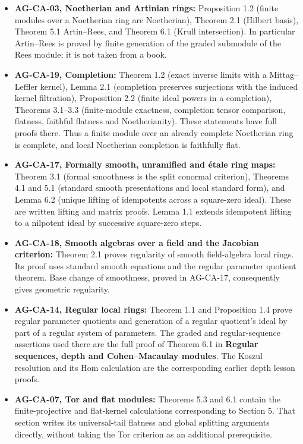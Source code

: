 \documentclass[11pt,a4paper,openany]{report}
\providecommand{\tightlist}{\setlength{\itemsep}{0pt}\setlength{\parskip}{0pt}}
\begin{document}
\begin{itemize}
\tightlist
\item
  \textbf{AG-CA-03, Noetherian and Artinian rings:} Proposition 1.2 (finite modules over a Noetherian ring are Noetherian), Theorem 2.1 (Hilbert basis), Theorem 5.1 Artin--Rees, and Theorem 6.1 (Krull intersection). In particular Artin--Rees is proved by finite generation of the graded submodule of the Rees module; it is not taken from a book.
\item
  \textbf{AG-CA-19, Completion:} Theorem 1.2 (exact inverse limits with a Mittag--Leffler kernel), Lemma 2.1 (completion preserves surjections with the induced kernel filtration), Proposition 2.2 (finite ideal powers in a completion), Theorems 3.1--3.3 (finite-module exactness, completion tensor comparison, flatness, faithful flatness and Noetherianity). These statements have full proofs there. Thus a finite module over an already complete Noetherian ring is complete, and local Noetherian completion is faithfully flat.
\item
  \textbf{AG-CA-17, Formally smooth, unramified and étale ring maps:} Theorem 3.1 (formal smoothness is the split conormal criterion), Theorems 4.1 and 5.1 (standard smooth presentations and local standard form), and Lemma 6.2 (unique lifting of idempotents across a square-zero ideal). These are written lifting and matrix proofs. Lemma 1.1 extends idempotent lifting to a nilpotent ideal by successive square-zero steps.
\item
  \textbf{AG-CA-18, Smooth algebras over a field and the Jacobian criterion:} Theorem 2.1 proves regularity of smooth field-algebra local rings. Its proof uses standard smooth equations and the regular parameter quotient theorem. Base change of smoothness, proved in AG-CA-17, consequently gives geometric regularity.
\item
  \textbf{AG-CA-14, Regular local rings:} Theorem 1.1 and Proposition 1.4 prove regular parameter quotients and generation of a regular quotient's ideal by part of a regular system of parameters. The graded and regular-sequence assertions used there are the full proof of Theorem 6.1 in \textbf{Regular sequences, depth and Cohen--Macaulay modules}. The Koszul resolution and its Hom calculation are the corresponding earlier depth lesson proofs.
\item
  \textbf{AG-CA-07, Tor and flat modules:} Theorems 5.3 and 6.1 contain the finite-projective and flat-kernel calculations corresponding to Section 5. That section writes its universal-tail flatness and global splitting arguments directly, without taking the Tor criterion as an additional prerequisite.

\end{itemize}
\end{document}
